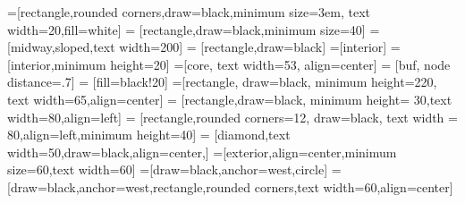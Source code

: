 \usepackage{listingsutf8}
\lstset{inputencoding=utf8/latin1}
\lstset{tabsize=4}
\usepackage{caption}
\usepackage{subcaption}
\usepackage{enumerate}
\usepackage{lineno}
\usepackage{array}
\usepackage{booktabs}
\usepackage[titletoc]{appendix}
\usepackage[binary-units]{siunitx}
\usepackage{titling}
\usepackage{soul}

\usepackage{hyperref}

\usepackage{tikz}
\usetikzlibrary{arrows,backgrounds,fit,positioning,petri,babel,shapes,circuits.logic.mux,circuits.logic.US,shapes.gates.logic,trees}

=[rectangle,rounded corners,draw=black,minimum size=3em, text width=20,fill=white]
 = [rectangle,draw=black,minimum size=40]
 = [midway,sloped,text width=200]
 = [rectangle,draw=black]
=[interior]
 = [interior,minimum height=20]
=[core, text width=53, align=center]
 = [buf, node distance=.7]
 = [fill=black!20]
=[rectangle, draw=black, minimum height=220, text width=65,align=center]
 = [rectangle,draw=black, minimum height= 30,text width=80,align=left]
 = [rectangle,rounded corners=12, draw=black, text width = 80,align=left,minimum height=40]
 = [diamond,text width=50,draw=black,align=center,]
=[exterior,align=center,minimum size=60,text width=60]
=[draw=black,anchor=west,circle]
=[draw=black,anchor=west,rectangle,rounded corners,text width=60,align=center]

\newcommand{\epg}[3]{
	Buffer {#1}\\
	[38.5pt]EP{#2}\\
	[38.5pt]{#3} Bytes}

\newcommand{\ep}[3]{
	Buffer {#1}\\
	[8pt]EP{#2}\\
	[8pt]{#3} Bytes}


\newcommand{\newwave}[1]{
	\path (0,\value{wavecount}) node[text width=70,anchor=east,align=right]{#1} node[coordinate](t_cur){};
	\draw (0,\value{wavecount}+.3) --++(.2,0);
	\draw (0,\value{wavecount}-.3) --++(.2,0);
	\path (t_cur) --++(.3,0)node[coordinate](t_cur){};
	\addtocounter{wavecount}{-1}}

